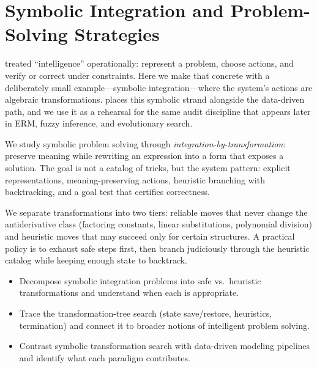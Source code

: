 \section{Symbolic Integration and Problem-Solving Strategies}\label{chap:symbolic}
\graphicspath{{assets/lec2_part1/}}

 treated ``intelligence'' operationally: represent a problem, choose actions, and verify or correct under constraints. Here we make that concrete with a deliberately small example---symbolic integration---where the system's actions are algebraic transformations.  places this symbolic strand alongside the data-driven path, and we use it as a rehearsal for the same audit discipline that appears later in ERM, fuzzy inference, and evolutionary search.

We study symbolic problem solving through \emph{integration-by-transformation}: preserve meaning while rewriting an expression into a form that exposes a solution. The goal is not a catalog of tricks, but the system pattern: explicit representations, meaning-preserving actions, heuristic branching with backtracking, and a goal test that certifies correctness.

We separate transformations into two tiers: reliable moves that never change the antiderivative class (factoring constants, linear substitutions, polynomial division) and heuristic moves that may succeed only for certain structures. A practical policy is to exhaust safe steps first, then branch judiciously through the heuristic catalog while keeping enough state to backtrack.

\begin{tcolorbox}[summarybox, title={Learning Outcomes}]
\begin{itemize}
    \item Decompose symbolic integration problems into safe vs.\ heuristic transformations and understand when each is appropriate.
    \item Trace the transformation-tree search (state save/restore, heuristics, termination) and connect it to broader notions of intelligent problem solving.
    \item Contrast symbolic transformation search with data-driven modeling pipelines and identify what each paradigm contributes.
\end{itemize}
\end{tcolorbox}

